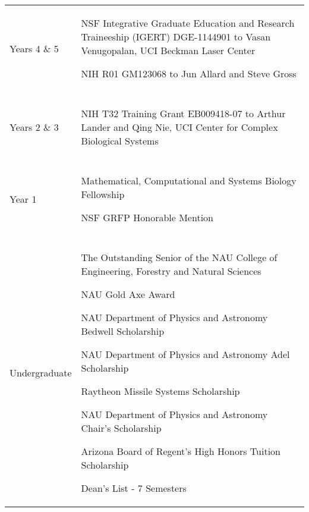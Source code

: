 \documentclass[letterpaper,10pt]{article} %
\makeatletter
\newcommand\cellwidth{\TX@col@width}
\makeatother
\begin{document}
\begin{tabularx}{\textwidth}{>{\raggedleft}p{} | X}

Years 4 \& 5 &
\begin{minipage}{\cellwidth}
\begin{description}[itemsep=.25ex,labelsep=0em]
\item NSF Integrative Graduate Education and Research Traineeship (IGERT) DGE-1144901 to Vasan Venugopalan, UCI Beckman Laser Center
\item NIH R01 GM123068 to Jun Allard and Steve Gross
\end{description}
\end{minipage} \\

\multicolumn{2}{c}{} \\

Years 2 \& 3 &
\begin{minipage}{\cellwidth}
\begin{description}[itemsep=.25ex,labelsep=0em]
\item NIH T32 Training Grant EB009418-07 to Arthur Lander and Qing Nie, UCI Center for Complex Biological Systems
\end{description}
\end{minipage} \\

\multicolumn{2}{c}{} \\

Year 1 &
\begin{minipage}{\cellwidth}
\begin{description}[itemsep=.25ex,labelsep=0em]
\item Mathematical, Computational and Systems Biology Fellowship
\item NSF GRFP Honorable Mention
\end{description}
\end{minipage} \\

\multicolumn{2}{c}{} \\
 
Undergraduate & 
\begin{minipage}{\cellwidth}
\begin{description}[itemsep=.25ex,labelsep=0em]
\item The Outstanding Senior of the NAU College of Engineering, Forestry and Natural Sciences 
\item NAU Gold Axe Award
\item NAU Department of Physics and Astronomy Bedwell Scholarship 
\item NAU Department of Physics and Astronomy Adel Scholarship 
\item Raytheon Missile Systems Scholarship 
\item NAU Department of Physics and Astronomy Chair's Scholarship 
\item Arizona Board of Regent's High Honors Tuition Scholarship 
\item Dean's List - 7 Semesters
\end{description}
\end{minipage}
\end{tabularx}
\end{document}
